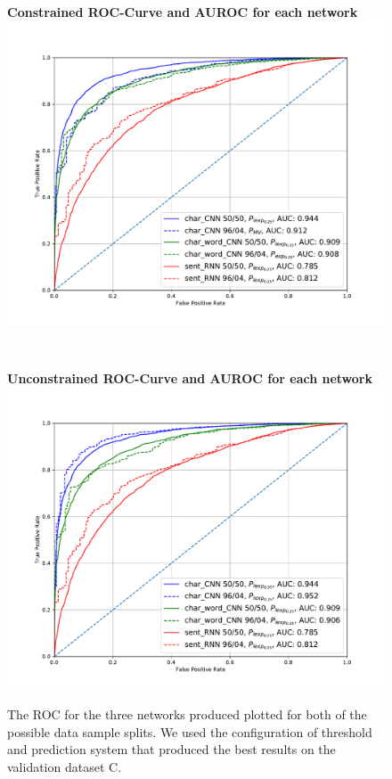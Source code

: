 \begin{figure}
    \centering
    \begin{minipage}{.8\textwidth}
        \centering
        \textbf{Constrained ROC-Curve and AUROC for each network}
        \includegraphics[width=1\linewidth]{./pictures/discussion/AUROC_Constrained}
    \end{minipage}\\
    \begin{minipage}{.8\textwidth}
        \centering
        \textbf{Unconstrained ROC-Curve and AUROC for each network}
        \includegraphics[width=1\linewidth]{./pictures/discussion/AUROC_Unconstrained}
    \end{minipage}
    \caption{The \gls{ROC} for the three networks produced plotted for both of
        the possible data sample splits. We used the configuration of threshold
        and prediction system that produced the best results on the validation
        dataset \gls{C}.}
    \label{fig:AUROC}
\end{figure}


